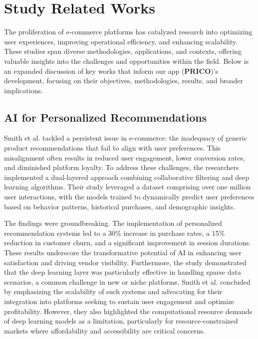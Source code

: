 \documentclass[12pt]{report}
\begin{document}
\section{Study Related Works}

The proliferation of e-commerce platforms has catalyzed research into optimizing user
experiences, improving operational efficiency, and enhancing scalability. These studies span
diverse methodologies, applications, and contexts, offering valuable insights into the
challenges and opportunities within the field. Below is an expanded discussion of key works
that inform our app (\textbf{PRICO})’s development, focusing on their objectives, methodologies,
results, and broader implications.

\subsection*{AI for Personalized Recommendations}

Smith et al. tackled a persistent issue in e-commerce: the inadequacy of generic product
recommendations that fail to align with user preferences. \cite{c16} This misalignment often results
in reduced user engagement, lower conversion rates, and diminished platform loyalty. To
address these challenges, the researchers implemented a dual-layered approach combining
collaborative filtering and deep learning algorithms. Their study leveraged a dataset
comprising over one million user interactions, with the models trained to dynamically predict
user preferences based on behavior patterns, historical purchases, and demographic insights.

The findings were groundbreaking. The implementation of personalized recommendation
systems led to a 30\% increase in purchase rates, a 15\% reduction in customer churn, and a
significant improvement in session durations. These results underscore the transformative
potential of AI in enhancing user satisfaction and driving vendor visibility. Furthermore, the
study demonstrated that the deep learning layer was particularly effective in handling sparse
data scenarios, a common challenge in new or niche platforms. Smith et al. concluded by
emphasizing the scalability of such systems and advocating for their integration into
platforms seeking to sustain user engagement and optimize profitability. However, they also
highlighted the computational resource demands of deep learning models as a limitation,
particularly for resource-constrained markets where affordability and accessibility are critical
concerns. \cite{c16}
\end{document}
